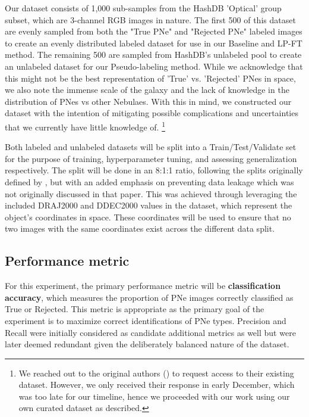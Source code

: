 \documentclass{article}
\begin{document}
Our dataset consists of 1,000 sub-samples from the HashDB 'Optical' group subset, which are 3-channel RGB images in nature. The first 500 of this dataset are evenly sampled from both the "True PNe" and "Rejected PNe" labeled images to create an evenly distributed labeled dataset for use in our Baseline and LP-FT method. The remaining 500 are sampled from HashDB's unlabeled pool to create an unlabeled dataset for our Pseudo-labeling method. While we acknowledge that this might not be the best representation of 'True' vs. 'Rejected' PNes in space, we also note the immense scale of the galaxy and the lack of knowledge in the distribution of PNes vs other Nebulaes. With this in mind, we constructed our dataset with the intention of mitigating possible complications and uncertainties that we currently have little knowledge of. \footnote{We reached out to the original authors (\cite{awangiskandar2020}) to request access to their existing dataset. However, we only received their response in early December, which was too late for our timeline, hence we proceeded with our work using our own curated dataset as described.}

Both labeled and unlabeled datasets will be split into a Train/Test/Validate set for the purpose of training, hyperparameter tuning, and assessing generalization respectively. The split will be done in an 8:1:1 ratio, following the splits originally defined by \cite{awangiskandar2020}, but with an added emphasis on preventing data leakage which was not originally discussed in that paper. This was achieved through leveraging the included DRAJ2000 and DDEC2000 values in the dataset, which represent the object's coordinates in space. These coordinates will be used to ensure that no two images with the same coordinates exist across the different data split. 

\subsection{Performance metric}
For this experiment, the primary performance metric will be \textbf{classification accuracy}, which measures the proportion of PNe images correctly classified as True or Rejected. This metric is appropriate as the primary goal of the experiment is to maximize correct identifications of PNe types. Precision and Recall were initially considered as candidate additional metrics as well but were later deemed redundant given the deliberately balanced nature of the dataset.
\end{document}
